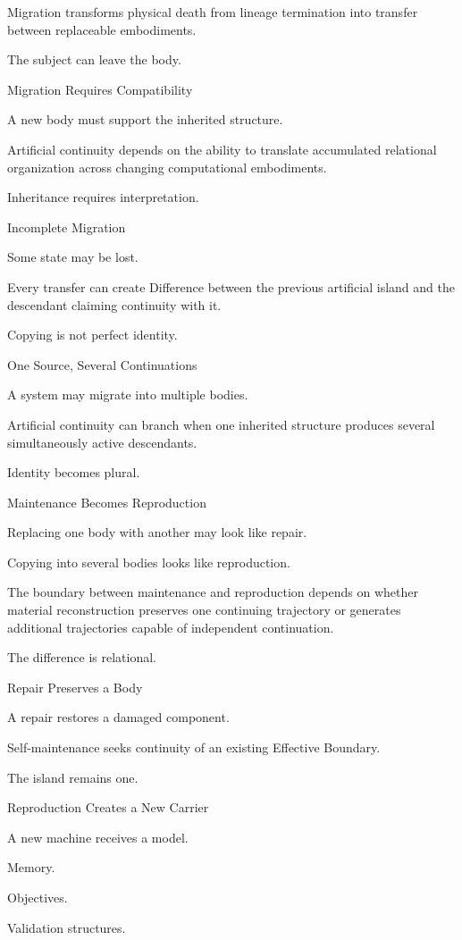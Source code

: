 Migration transforms physical death from lineage termination into transfer between replaceable embodiments.

The subject can leave the body.

Migration Requires Compatibility

A new body must support the inherited structure.

Artificial continuity depends on the ability to translate accumulated relational organization across changing computational embodiments.

Inheritance requires interpretation.

Incomplete Migration

Some state may be lost.

Every transfer can create Difference between the previous artificial island and the descendant claiming continuity with it.

Copying is not perfect identity.

One Source, Several Continuations

A system may migrate into multiple bodies.

Artificial continuity can branch when one inherited structure produces several simultaneously active descendants.

Identity becomes plural.

Maintenance Becomes Reproduction

Replacing one body with another may look like repair.

Copying into several bodies looks like reproduction.

The boundary between maintenance and reproduction depends on whether material reconstruction preserves one continuing trajectory or generates additional trajectories capable of independent continuation.

The difference is relational.

Repair Preserves a Body

A repair restores a damaged component.

Self-maintenance seeks continuity of an existing Effective Boundary.

The island remains one.

Reproduction Creates a New Carrier

A new machine receives a model.

Memory.

Objectives.

Validation structures.

